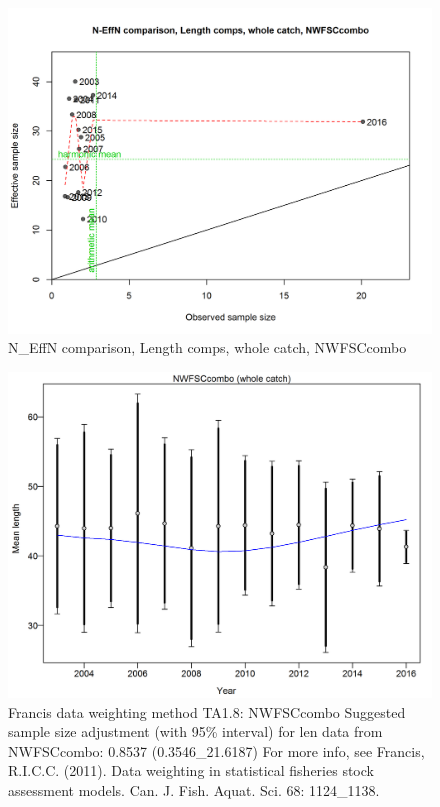 \documentclass[12pt,]{article}
\begin{document}
\begin{figure}[htbp]
\centering
\includegraphics{./r4ss/plots_mod1/comp_lenfit_sampsize_flt6mkt0.png}
\caption{N\_EffN comparison, Length comps, whole catch, NWFSCcombo
\label{fig:mod1_28_comp_lenfit_sampsize_flt6mkt0}}
\end{figure}

\begin{figure}[htbp]
\centering
\includegraphics{./r4ss/plots_mod1/comp_lenfit_data_weighting_TA1.8_NWFSCcombo.png}
\caption{Francis data weighting method TA1.8: NWFSCcombo Suggested
sample size adjustment (with 95\% interval) for len data from
NWFSCcombo: 0.8537 (0.3546\_21.6187) For more info, see Francis,
R.I.C.C. (2011). Data weighting in statistical fisheries stock
assessment models. Can. J. Fish. Aquat. Sci. 68: 1124\_1138.
\label{fig:mod1_29_comp_lenfit_data_weighting_TA1.8_NWFSCcombo}}
\end{figure}
\end{document}
